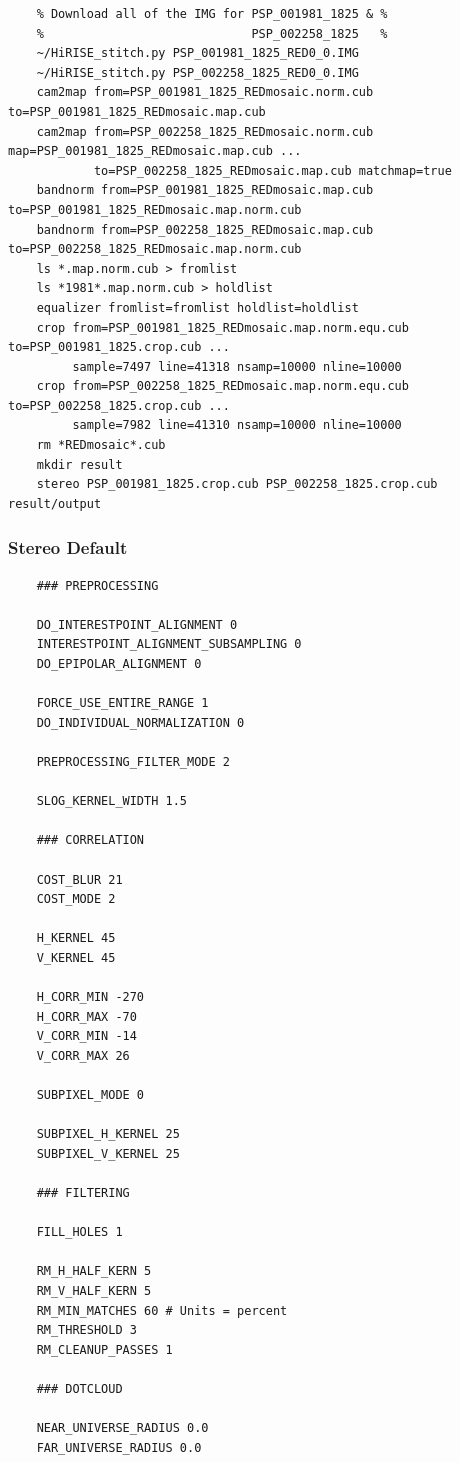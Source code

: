 \begin{verbatim}
    % Download all of the IMG for PSP_001981_1825 & %
    %                             PSP_002258_1825   %
    ~/HiRISE_stitch.py PSP_001981_1825_RED0_0.IMG
    ~/HiRISE_stitch.py PSP_002258_1825_RED0_0.IMG
    cam2map from=PSP_001981_1825_REDmosaic.norm.cub to=PSP_001981_1825_REDmosaic.map.cub
    cam2map from=PSP_002258_1825_REDmosaic.norm.cub map=PSP_001981_1825_REDmosaic.map.cub ...
            to=PSP_002258_1825_REDmosaic.map.cub matchmap=true
    bandnorm from=PSP_001981_1825_REDmosaic.map.cub to=PSP_001981_1825_REDmosaic.map.norm.cub
    bandnorm from=PSP_002258_1825_REDmosaic.map.cub to=PSP_002258_1825_REDmosaic.map.norm.cub
    ls *.map.norm.cub > fromlist
    ls *1981*.map.norm.cub > holdlist
    equalizer fromlist=fromlist holdlist=holdlist
    crop from=PSP_001981_1825_REDmosaic.map.norm.equ.cub to=PSP_001981_1825.crop.cub ...
         sample=7497 line=41318 nsamp=10000 nline=10000
    crop from=PSP_002258_1825_REDmosaic.map.norm.equ.cub to=PSP_002258_1825.crop.cub ...
         sample=7982 line=41310 nsamp=10000 nline=10000
    rm *REDmosaic*.cub
    mkdir result
    stereo PSP_001981_1825.crop.cub PSP_002258_1825.crop.cub result/output
\end{verbatim}

\subsubsection*{Stereo Default}

\begin{verbatim}
    ### PREPROCESSING

    DO_INTERESTPOINT_ALIGNMENT 0
    INTERESTPOINT_ALIGNMENT_SUBSAMPLING 0
    DO_EPIPOLAR_ALIGNMENT 0

    FORCE_USE_ENTIRE_RANGE 1
    DO_INDIVIDUAL_NORMALIZATION 0

    PREPROCESSING_FILTER_MODE 2

    SLOG_KERNEL_WIDTH 1.5

    ### CORRELATION

    COST_BLUR 21
    COST_MODE 2

    H_KERNEL 45
    V_KERNEL 45

    H_CORR_MIN -270
    H_CORR_MAX -70
    V_CORR_MIN -14
    V_CORR_MAX 26

    SUBPIXEL_MODE 0

    SUBPIXEL_H_KERNEL 25
    SUBPIXEL_V_KERNEL 25

    ### FILTERING

    FILL_HOLES 1

    RM_H_HALF_KERN 5
    RM_V_HALF_KERN 5
    RM_MIN_MATCHES 60 # Units = percent
    RM_THRESHOLD 3
    RM_CLEANUP_PASSES 1

    ### DOTCLOUD

    NEAR_UNIVERSE_RADIUS 0.0
    FAR_UNIVERSE_RADIUS 0.0
\end{verbatim}


